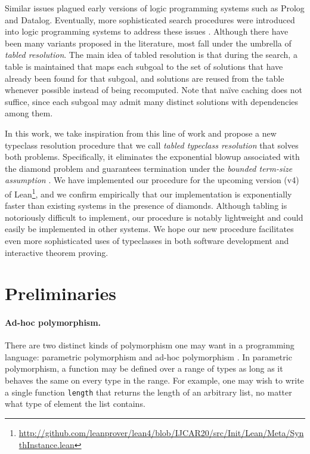 \documentclass[runningheads]{llncs}
\newcommand{\icode}[1]{\texttt{\small #1}}
\begin{document}
\begin{sloppypar}
Similar issues plagued early versions of logic programming systems such as Prolog and Datalog.
Eventually, more sophisticated search procedures were introduced into logic programming systems to address these issues \cite{tamaki1986old,vielle1989recursive,de1994lpda,chen1996tabled,sagonas1998abstract,demoen1998cat,demoen1999chat,guo2001simple,shen2001linear,swift2012xsb,zhou2008linear}.
Although there have been many variants proposed in the literature, most fall under the umbrella of \emph{tabled resolution}.
The main idea of tabled resolution is that during the search, a table is maintained that maps each subgoal to the set of solutions that have already been found for that subgoal,
and solutions are reused from the table whenever possible instead of being recomputed.
Note that na\"{i}ve caching does not suffice, since each subgoal may admit many distinct solutions with dependencies among them.
\end{sloppypar}

In this work, we take inspiration from this line of work and propose a new typeclass resolution procedure that we call \emph{tabled typeclass resolution}
that solves both problems.
Specifically, it eliminates the exponential blowup associated with the diamond problem and guarantees termination under the \emph{bounded term-size assumption} \cite{van1991well}.
  We have implemented our procedure for the upcoming version (v4) of Lean\footnote{\url{http://github.com/leanprover/lean4/blob/IJCAR20/src/Init/Lean/Meta/SynthInstance.lean}},
  and we confirm empirically that our implementation is exponentially faster than existing systems in the presence of diamonds.
Although tabling is notoriously difficult to implement,
our procedure is notably lightweight and could easily be implemented in other systems.
We hope our new procedure facilitates even more sophisticated uses of typeclasses in both software development and interactive theorem proving.

\section{Preliminaries}\label{sec:prelim}

\paragraph{Ad-hoc polymorphism.}
There are two distinct kinds of polymorphism one may want in a programming language: parametric polymorphism and ad-hoc polymorphism \cite{strachey2000fundamental}.
In parametric polymorphism, a function may be defined over a range of types as long as it behaves the same on every type in the range.
For example, one may wish to write a single function \icode{length} that returns the length of an arbitrary list,
no matter what type of element the list contains.
\end{document}
